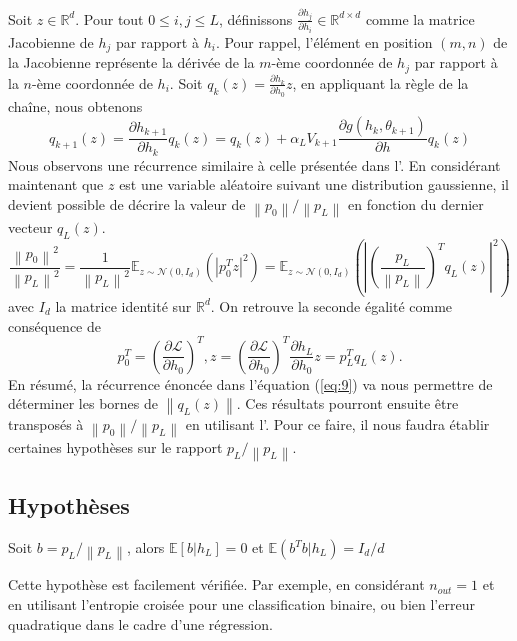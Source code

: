Soit $z \in \mathbb{R}^d$. Pour tout $0 \leqslant i, j \leqslant L$, définissons $\frac{\partial h_j}{\partial h_i} \in \mathbb{R}^{d \times d}$ comme la matrice Jacobienne de $h_j$ par rapport à $h_i$. Pour rappel, l'élément en position $(m, n)$ de la Jacobienne représente la dérivée de la $m$-ème coordonnée de $h_j$ par rapport à la $n$-ème coordonnée de $h_i$. Soit $q_k(z) = \frac{\partial h_k}{\partial h_0} z$, en appliquant la règle de la chaîne, nous obtenons
\begin{equation}\label{eq:9}
    q_{k+1}(z) = \frac{\partial h_{k+1}}{\partial h_k} q_k(z) = q_k(z) + \alpha _L V_{k+1} \frac{\partial g(h_k, \theta _{k+1})}{\partial h} q_k(z)
\end{equation}
Nous observons une récurrence similaire à celle présentée dans l'. En considérant maintenant que $z$ est une variable aléatoire suivant une distribution gaussienne, il devient possible de décrire la valeur de $\left\| p_0 \right\| / \left\| p_L \right\|$ en fonction du dernier vecteur $q_L(z)$.
\begin{equation}\label{eq:10}
    \frac{\left\| p_0 \right\| ^2}{\left\| p_L \right\| ^2} = \frac{1}{\left\| p_L \right\| ^2} \mathbb{E}_{z \sim \mathcal{N}(0, I_d)}\left(\left| p_0^T z  \right| ^2 \right) = \mathbb{E}_{z \sim \mathcal{N}(0, I_d)}\left(\left| \left(\frac{p_L}{\left\| p_L \right\| } \right)^T q_L(z) \right| ^2 \right)
\end{equation}
avec $ I_d $ la matrice identité sur $ \mathbb{R}^d $. On retrouve la seconde égalité comme conséquence de 
\[
    p_0^T = \left(\frac{\partial \mathscr{L}}{\partial h_0} \right)^T, z = \left(\frac{\partial \mathscr{L}}{\partial h_0} \right)^T \frac{\partial h_L}{\partial h_0} z = p_L^T  q_L(z)
.\]
En résumé, la récurrence énoncée dans l'équation (\ref{eq:9}) va nous permettre de déterminer les bornes de $\left\| q_L(z) \right\|$. Ces résultats pourront ensuite être transposés à $\left\| p_0 \right\| / \left\| p_L \right\|$ en utilisant l'. Pour ce faire, il nous faudra établir certaines hypothèses sur le rapport $p_L / \left\| p_L \right\|$.

\subsection*{Hypothèses}

\begin{assumption}\label{H3}
    Soit $ b= p_L / \left\| p_L \right\|  $, alors $ \mathbb{E}[b | h_L] = 0 $ et $ \mathbb{E}(b^T b | h_L) = I_d / d $
\end{assumption}
\begin{note}
    Cette hypothèse est facilement vérifiée. Par exemple, en considérant $n_{out} = 1$ et en utilisant l'entropie croisée pour une classification binaire, ou bien l'erreur quadratique dans le cadre d'une régression.
\end{note}

